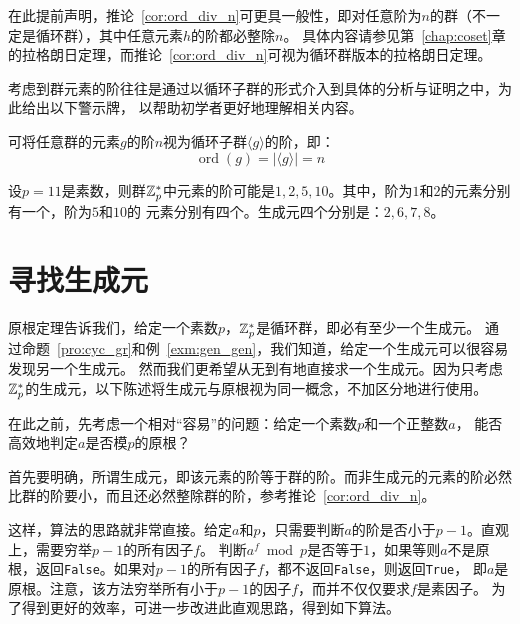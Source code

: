 在此提前声明，推论~\ref{cor:ord_div_n}可更具一般性，即对任意阶为$n$的群（不一定是循环群），其中任意元素$h$的阶都必整除$n$。
具体内容请参见第~\ref{chap:coset}章的拉格朗日定理，而推论~\ref{cor:ord_div_n}可视为循环群版本的拉格朗日定理。

考虑到群元素的阶往往是通过以循环子群的形式介入到具体的分析与证明之中，为此给出以下警示牌，
以帮助初学者更好地理解相关内容。
\begin{center}
	\begin{tcolorbox}[colback=green!5!white, colframe=red!75!black,width = 10cm]
		可将任意群的元素$g$的阶$n$视为循环子群$\langle g \rangle$的阶，即：
			\[ \operatorname{ord}(g) = |\langle g \rangle| = n\]
	\end{tcolorbox}
\end{center}

\begin{example}
		设$p  = 11$是素数，则群${\mathbb Z}_p^*$中元素的阶可能是$1, 2, 5, 10$。其中，阶为$1$和$2$的元素分别有一个，阶为$5$和$10$的
		元素分别有四个。生成元四个分别是：$2, 6, 7, 8$。
\end{example}

\section{寻找生成元}
原根定理告诉我们，给定一个素数$p$，${\mathbb Z}_p^*$是循环群，即必有至少一个生成元。
通过命题~\ref{pro:cyc_gr}和例~\ref{exm:gen_gen}，我们知道，给定一个生成元可以很容易发现另一个生成元。
然而我们更希望从无到有地直接求一个生成元。因为只考虑${\mathbb Z}_p^*$的生成元，以下陈述将生成元与原根视为同一概念，不加区分地进行使用。

在此之前，先考虑一个相对“容易”的问题：给定一个素数$p$和一个正整数$a$，
能否高效地判定$a$是否模$p$的原根？

首先要明确，所谓生成元，即该元素的阶等于群的阶。而非生成元的元素的阶必然比群的阶要小，而且还必然整除群的阶，参考推论~\ref{cor:ord_div_n}。

这样，算法的思路就非常直接。给定$a$和$p$，只需要判断$a$的阶是否小于$p-1$。直观上，需要穷举$p - 1$的所有因子$f$。
判断$a^f \bmod p$是否等于$1$，如果等则$a$不是原根，返回\texttt{False}。如果对$p-1$的所有因子$f$，都不返回\texttt{False}，则返回\texttt{True}，
即$a$是原根。注意，该方法穷举所有小于$p-1$的因子$f$，而并不仅仅要求$f$是素因子。
为了得到更好的效率，可进一步改进此直观思路，得到如下算法。
\begin{center}
	
\end{center}

